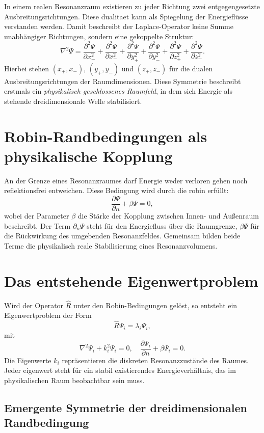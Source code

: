 In einem realen Resonanzraum existieren zu jeder Richtung zwei entgegengesetzte Ausbreitungsrichtungen.
Diese \gls{dualitaet} kann als Spiegelung der Energieflüsse verstanden werden.
Damit beschreibt der Laplace-Operator keine Summe unabhängiger Richtungen,
sondern eine gekoppelte Struktur:
\[
\nabla^2 \Psi =
\frac{\partial^2 \Psi}{\partial x_+^2} +
\frac{\partial^2 \Psi}{\partial x_-^2} +
\frac{\partial^2 \Psi}{\partial y_+^2} +
\frac{\partial^2 \Psi}{\partial y_-^2} +
\frac{\partial^2 \Psi}{\partial z_+^2} +
\frac{\partial^2 \Psi}{\partial z_-^2}.
\]
Hierbei stehen $(x_+,x_-)$, $(y_+,y_-)$ und $(z_+,z_-)$
für die dualen Ausbreitungsrichtungen der Raumdimensionen.
Diese Symmetrie beschreibt erstmals ein \emph{physikalisch geschlossenes Raumfeld},
in dem sich Energie als stehende dreidimensionale Welle stabilisiert.

\section{Robin-Randbedingungen als physikalische Kopplung}

An der Grenze eines Resonanzraumes darf Energie weder verloren gehen noch reflektionsfrei entweichen.
Diese Bedingung wird durch die \gls{robin} erfüllt:
\[
\frac{\partial \Psi}{\partial n} + \beta \Psi = 0,
\]
wobei der Parameter $\beta$ die Stärke der Kopplung zwischen Innen- und Außenraum beschreibt.
Der Term $\partial_n \Psi$ steht für den Energiefluss über die Raumgrenze,
$\beta \Psi$ für die Rückwirkung des umgebenden Resonanzfeldes.
Gemeinsam bilden beide Terme die physikalisch reale Stabilisierung eines Resonanzvolumens.

\section{Das entstehende Eigenwertproblem}

Wird der Operator $\hat{R}$ unter den Robin-Bedingungen gelöst,
so entsteht ein Eigenwertproblem der Form
\[
\hat{R}\Psi_i = \lambda_i \Psi_i,
\]
mit
\[
\nabla^2 \Psi_i + k_i^2 \Psi_i = 0, \quad
\frac{\partial \Psi_i}{\partial n} + \beta \Psi_i = 0.
\]
Die Eigenwerte $k_i$ repräsentieren die diskreten Resonanzzustände des Raumes.
Jeder \gls{eigenwert} steht für ein stabil existierendes Energieverhältnis,
das im physikalischen Raum beobachtbar sein muss.

\newpage

\subsection{Emergente Symmetrie der dreidimensionalen Randbedingung}

